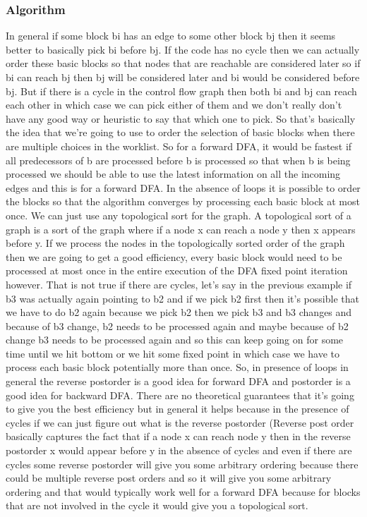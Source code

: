\subsubsection{Algorithm}
In general if some block bi has an edge to some other block bj then it seems better to basically pick bi before bj. If the code has no cycle then we can actually order these basic blocks so that nodes that are reachable are considered later so if bi can reach bj then bj will be considered later and bi would be considered before bj. But if there is a cycle in the control flow graph then both bi and bj can reach each other in which case we can pick either of them and we don't really don't have any good way or heuristic to say that which one to pick. So that's basically the idea that we're going to use to order the selection of basic blocks when there are multiple choices in the worklist. So for a forward DFA, it would be fastest if all predecessors of b are processed before b is processed so that when b is being processed we should be able to use the latest information on all the incoming edges and this is for a forward DFA. In the absence of loops it is possible to order the blocks so that the algorithm converges by processing each basic block at most once. We can just use any topological sort for the graph. A topological sort of a graph is a sort of the graph where if a node x can reach a node y then x appears before y. If we process the nodes in the topologically sorted order of the graph then we are going to get a good efficiency, every basic block would need to be processed at most once in the entire execution of the DFA fixed point iteration however. That is not true if there are cycles, let's say in the
previous example if b3 was actually again pointing to b2 and if we pick b2 first then it's possible that we have to do b2 again because we pick b2 then we pick b3 and b3 changes and because of b3 change, b2 needs to be processed again and maybe because of b2 change b3 needs to be processed again and so this can keep going on for some time until  we hit bottom or we hit some fixed point in which case we have to process each basic block potentially more than once. So, in presence of loops in general the reverse postorder is a good idea for forward DFA and postorder is a good idea for backward DFA. There are no theoretical guarantees that it's going to give you the best efficiency but in general it helps because in the presence of cycles if we can just figure out what is the reverse postorder (Reverse post order basically captures the fact that if a node x can reach node y then in the reverse postorder x would appear before y in the absence of cycles and even if there are cycles some reverse postorder will give you some arbitrary ordering because there could be multiple reverse post orders and so it will give you some arbitrary ordering and that would typically work well for a forward DFA because for blocks that are not involved in the cycle it would give you a topological sort.

